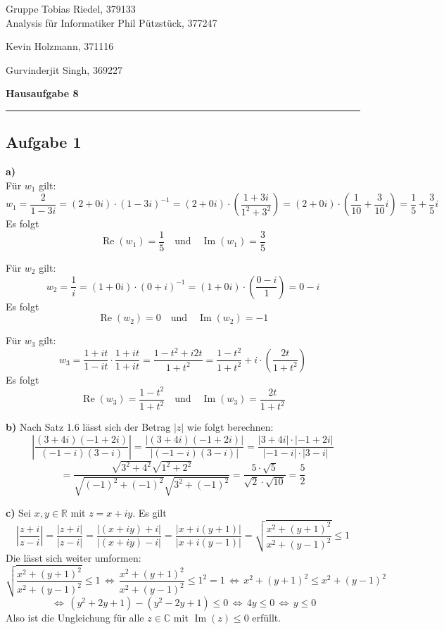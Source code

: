 \documentclass[a4paper,graphics,11pt]{article}
\newcommand{\aufgabe}[1]{\subsection*{Aufgabe #1}}
\newcommand{\re}{\operatorname{Re}}
\newcommand{\im}{\operatorname{Im}}
\begin{document}
\noindent Gruppe              \hfill Tobias Riedel, 379133 \\
\noindent Analysis für Informatiker             \hfill Phil Pützstück, 377247 \\
\strut\hfill Kevin Holzmann, 371116\\
\strut\hfill Gurvinderjit Singh, 369227
\begin{center}
	\LARGE{\textbf{Hausaufgabe 8}}
\end{center}
\begin{center}
\rule[0.1ex]{\textwidth}{1pt}
\end{center}

\aufgabe{1}
\textbf{a)}\\
Für $w_1$ gilt:
$$
    w_1 = \frac{2}{1-3i}
    = (2+0i)\cdot (1-3i)^{-1}
    = (2+0i) \cdot \left(\frac{1+3i}{1^2+3^2}\right)
    = (2+0i) \cdot \left(\frac{1}{10} + \frac{3}{10}i\right)
    = \frac{1}{5} + \frac{3}{5}i
$$
Es folgt
$$
    \re(w_1) = \frac{1}{5} \quad \text{und}\quad \im(w_1) = \frac{3}{5}
$$

Für $w_2$ gilt:
$$
    w_2 = \frac{1}{i}
    = (1+0i)\cdot (0+i)^{-1}
    = (1+0i)\cdot\left(\frac{0-i}{1}\right)
    = 0-i
$$
Es folgt
$$
    \re(w_2) = 0 \quad \text{und}\quad \im(w_2) = -1
$$

Für $w_3$ gilt:
$$
    w_3 = \frac{1+it}{1-it} \cdot \frac{1+it}{1+it}
    =\frac{1-t^2+i2t}{1+t^2} = \frac{1-t^2}{1+t^2} + i\cdot\left(\frac{2t}{1+t^2}\right)
$$
Es folgt
$$
    \re(w_3) = \frac{1-t^2}{1+t^2} \quad \text{und}\quad \im(w_3) = \frac{2t}{1+t^2}
$$

\textbf{b)}
Nach Satz 1.6 lässt sich der Betrag $|z|$ wie folgt berechnen:
$$
    \left|\frac{(3+4i)(-1+2i)}{(-1-i)(3-i)}\right|
    = \frac{|(3+4i)(-1+2i)|}{|(-1-i)(3-i)|}
    =\frac{|3+4i|\cdot|-1+2i|}{|-1-i|\cdot|3-i|} 
$$$$
    =\frac{\sqrt{3^2+4^2}\sqrt{1^2+2^2}}{\sqrt{(-1)^2+(-1)^2}\sqrt{3^2+(-1)^2}}
    = \frac{5\cdot\sqrt{5}}{\sqrt{2}\cdot\sqrt{10}} = \frac{5}{2}
$$

\textbf{c)}
Sei $x,y \in \mathbb{R}$ mit $z=x+iy$. Es gilt
$$
    \left|\frac{z+i}{z-i}\right|
    = \frac{|z+i|}{|z-i|}
    = \frac{|(x+iy)+i|}{|(x+iy)-i|}
    = \frac{|x+i(y+1)|}{|x+i(y-1)|}
    = \sqrt{\frac{x^2+(y+1)^2}{x^2+(y-1)^2}}
    \leq 1
$$
Die lässt sich weiter umformen:
$$
    \sqrt{\frac{x^2+(y+1)^2 }{x^2+(y-1)^2}} \leq 1
    \,\Longleftrightarrow\, \frac{x^2+(y+1)^2}{x^2+(y-1)^2} \leq 1^2 = 1
    \,\Longleftrightarrow\, x^2+(y+1)^2 \leq x^2+(y-1)^2
$$$$
    \,\Longleftrightarrow\, (y^2+2y+1)-(y^2-2y+1) \leq 0
    \,\Longleftrightarrow\, 4y \leq 0
    \,\Longleftrightarrow\, y \leq 0
$$
Also ist die Ungleichung für alle $z \in \mathbb{C}$ mit $\im(z) \leq 0$ erfüllt.
\end{document}
